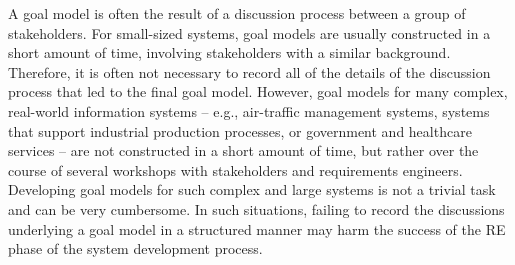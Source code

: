 


A goal model is often the result of a discussion process between a group of stakeholders. For small-sized systems, goal models are usually constructed in a short amount of time, involving stakeholders with a similar background. Therefore, it is often not necessary to record all of the details of the discussion process that led to the final goal model. However, goal models for many complex, real-world information systems -- e.g., air-traffic management systems, systems that support industrial production processes, or government and healthcare services -- are not constructed in a short amount of time, but rather over the course of several workshops with stakeholders and requirements engineers.  %
Developing goal models for such complex and large systems is not a trivial task and can be very cumbersome. In such situations, failing to record the discussions underlying a goal model in a structured manner may harm the success of the RE phase of the system development process. 

